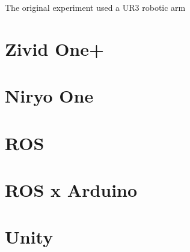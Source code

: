 The original experiment used a UR3 robotic arm





\section{Zivid One+}

\section{Niryo One}

\section{ROS}

\section{ROS x Arduino}



\section{Unity}

